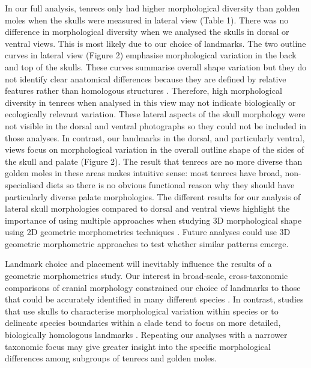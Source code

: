 \documentclass[12pt,a4paper]{article}
\begin{document}
	In our full analysis, tenrecs only had higher morphological diversity than golden moles when the skulls were measured in lateral view (Table 1). There was no difference in morphological diversity when we analysed the skulls in dorsal or ventral views. This is most likely due to our choice of landmarks. The two outline curves in lateral view (Figure 2) emphasise morphological variation in the back and top of the skulls. These curves summarise overall shape variation but they do not identify clear anatomical differences because they are defined by relative features rather than homologous structures \citep{Zelditch2012}. Therefore, high morphological diversity in tenrecs when analysed in this view may not indicate biologically or ecologically relevant variation.	
	These lateral aspects of the skull morphology were not visible in the dorsal and ventral photographs so they could not be included in those analyses. In contrast, our landmarks in the dorsal, and particularly ventral, views focus on morphological variation in the overall outline shape of the sides of the skull and palate (Figure 2). The result that tenrecs are no more diverse than golden moles in these areas makes intuitive sense: most tenrecs have broad, non-specialised diets \citep{Olson2013} so there is no obvious functional reason why they should have particularly diverse palate morphologies. The different results for our analysis of lateral skull morphologies compared to dorsal and ventral views highlight the importance of using multiple approaches when studying 3D morphological shape using 2D geometric morphometrics techniques \citep{Arnqvist1998}. Future analyses could use 3D geometric morphometric approaches to test whether similar patterns emerge.
    
    Landmark choice and placement will inevitably influence the results of a geometric morphometrics study. Our interest in broad-scale, cross-taxonomic comparisons of cranial morphology constrained our choice of landmarks to those that could be accurately identified in many different species \citep[e.g.][]{Ruta2013, Goswami2011, Wroe2007, Goswami2006}. In contrast, studies that use skulls to characterise morphological variation within species \citep[e.g.][]{Blagojevic2011, Giannini2010, Flores2010, Bornholdt2008} or to delineate species boundaries within a clade \citep[e.g.][]{Panchetti2008} tend to focus on more detailed, biologically homologous landmarks \citep{Zelditch2012}. Repeating our analyses with a narrower taxonomic focus may give greater insight into the specific morphological differences among subgroups of tenrecs and golden moles.
	
\end{document}
